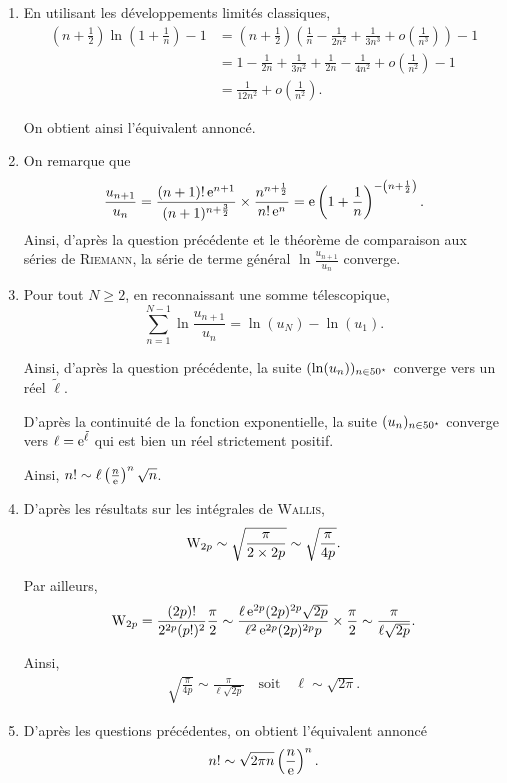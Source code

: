 \begin{preuve}
\begin{enumerate}
\item En utilisant les développements limités classiques,
\begin{align*}
\left(n + \frac{1}{2}\right) \ln\mathopen{}\left(1 + \frac{1}{n}\right) - 1
&= \left(n + \frac{1}{2}\right) \left(\frac{1}{n} - \frac{1}{2 n^2} + \frac{1}{3 n^3} + o\mathopen{}\left(\frac{1}{n^3}\right)\right) - 1\\
&= 1 - \frac{1}{2 n} + \frac{1}{3 n^2} + \frac{1}{2 n} - \frac{1}{4 n^2} + o\mathopen{}\left(\frac{1}{n^2}\right) - 1\\
&= \frac{1}{12 n^2} + o\mathopen{}\left(\frac{1}{n^2}\right).
\end{align*}

On obtient ainsi l'équivalent annoncé.

\item On remarque que
\[
\frac{u_{n+1}}{u_n}
= \frac{(n + 1)!\, \mathrm{e}^{n+1}}{(n+1)^{n+\frac{3}{2}}} \times \frac{n^{n+\frac{1}{2}}}{n!\, \mathrm{e}^n}
= \mathrm{e} \left(1 + \frac{1}{n}\right)^{-\mathopen{}\left(n + \frac{1}{2}\right)}.
\]
Ainsi, d'après la question précédente et le théorème de comparaison aux séries de \textsc{Riemann}, la série de terme général $\ln\frac{u_{n+1}}{u_n}$ converge.

\item Pour tout $N \geqslant 2$, en reconnaissant une somme télescopique,
\[
\sum_{n=1}^{N-1} \ln\frac{u_{n+1}}{u_n} = \ln(u_N) - \ln(u_1).
\]

Ainsi, d'après la question précédente, la suite $(\ln(u_n))_{n\in50^\star}$ converge vers un réel $\tilde{\ell}$.

D'après la continuité de la fonction exponentielle, la suite $(u_n)_{n\in50^\star}$ converge vers $\ell = \mathrm{e}^{\tilde{\ell}}$ qui est bien un réel strictement positif.

Ainsi, $n! \sim \ell \left(\frac{n}{\mathrm{e}}\right)^n \sqrt{n}$.

\item D'après les résultats sur les intégrales de \textsc{Wallis},
\[
\mathrm{W}_{2p}
\sim \sqrt{\frac{\pi}{2\times 2p}}
\sim \sqrt{\frac{\pi}{4 p}}.
\]

Par ailleurs,
\begin{align*}
\mathrm{W}_{2p}
= \frac{(2p)!}{2^{2p} (p!)^2} \frac{\pi}{2}
\sim \frac{\ell\, \mathrm{e}^{2p} (2p)^{2p} \sqrt{2p}}{\ell^2\, \mathrm{e}^{2p} (2p)^{2p} p} \times \frac{\pi}{2}
\sim \frac{\pi}{\ell \sqrt{2 p}}.
\end{align*}

Ainsi,
\begin{align*}
\sqrt{\frac{\pi}{4 p}} \sim \frac{\pi}{\ell \sqrt{2p}}
\quad \text{soit} \quad 
\ell \sim \sqrt{2 \pi}.
\end{align*}

\item D'après les questions précédentes, on obtient l'équivalent annoncé
\[
n! \sim \sqrt{2 \pi n} \left(\frac{n}{\mathrm{e}}\right)^n.
\]
\end{enumerate}
\end{preuve}

